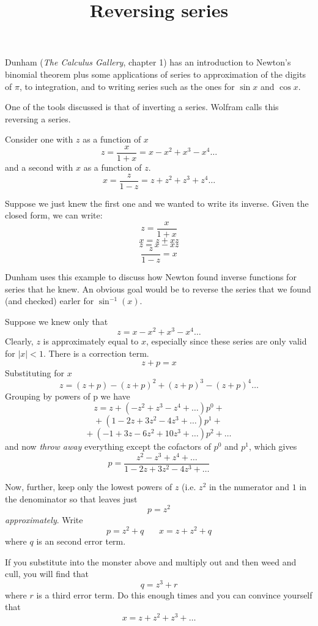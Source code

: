 \documentclass[11pt, oneside]{article}
\title{Reversing series}
\date{}
\begin{document}
\maketitle
\Large


Dunham (\emph{The Calculus Gallery}, chapter 1) has an introduction to Newton's binomial theorem plus some applications of series to approximation of the digits of $\pi$, to integration, and to writing series such as the ones for $\sin x$ and $\cos x$.

One of the tools discussed is that of inverting a series.  Wolfram calls this reversing a series.  

Consider one with $z$ as a function of $x$
\[ z = \frac{x}{1 + x} = x - x^2 + x^3 - x^4 \dots \]
and a second with $x$ as a function of $z$.
\[ x = \frac{z}{1 - z} = z + z^2 + z^3 + z^4 \dots \]

Suppose we just knew the first one and we wanted to write its inverse.  Given the closed form, we can write:
\[ z = \frac{x}{1 + x} \]
\[ x = z + xz \]
\[ z = x - xz \]
\[ \frac{z}{1 - z} = x \]

Dunham uses this example to discuss how Newton found inverse functions for series that he knew.  An obvious goal would be to reverse the series that we found (and checked) earler for $\sin^{-1}(x)$.

Suppose we knew only that
\[ z =  x - x^2 + x^3 - x^4 \dots \]
Clearly, $z$ is approximately equal to $x$, especially since these series are only valid for $|x| < 1$.  There is a correction term.
\[ z + p = x \]
Substituting for $x$
\[ z = (z + p) - (z + p)^2 + (z + p)^3 - (z + p)^4 \dots \]
Grouping by powers of p we have
\[ z = z +  (-z^2 + z^3 - z^4 + \dots)p^0 + \]
\[ + \ (1 - 2z + 3z^2 - 4z^3 + \dots)p^1 +  \]
\[ + \ (-1 + 3z - 6z^2 + 10z^3 + \dots)p^2 + \dots \]
and now \emph{throw away} everything except the cofactors of $p^0$ and $p^1$, which gives
\[ p = \frac{z^2 - z^3 + z^4 + \dots}{1 - 2z + 3z^2 - 4z^3 + \dots} \]

 Now, further, keep only the lowest powers of $z$ (i.e. $z^2$ in the numerator and $1$ in the denominator so that leaves just
 \[ p = z^2 \]
 \emph{approximately}.  Write
\[ p = z^2 + q \ \ \ \ \ \ \ \ x = z + z^2 + q \]
where $q$ is an second error term.

If you substitute into the monster above and multiply out and then weed and cull, you will find that
\[ q = z^3 + r \]
where $r$ is a third error term.  Do this enough times and you can convince yourself that 
\[ x = z + z^2 + z^3 + \dots \]
\end{document}
